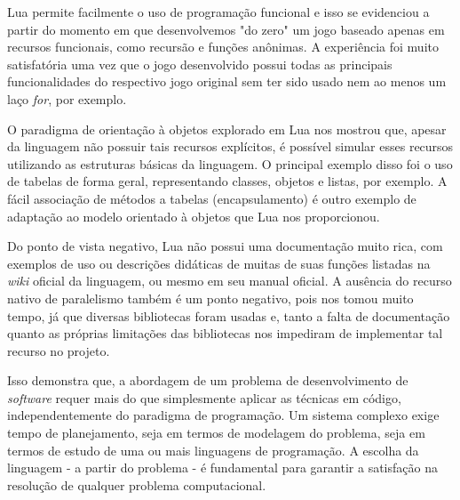 \documentclass[rel_mlp]{iiufrgs}
\begin{document}
Lua permite facilmente o uso de programação funcional e isso se evidenciou a partir do momento em que desenvolvemos "do zero" um jogo baseado apenas em recursos funcionais, como recursão e funções anônimas. A experiência foi muito satisfatória uma vez que o jogo desenvolvido possui todas as principais funcionalidades do respectivo jogo original sem ter sido usado nem ao menos um laço \textit{for}, por exemplo. 

O paradigma de orientação à objetos explorado em Lua nos mostrou que, apesar da linguagem não possuir tais recursos explícitos, é possível simular esses recursos utilizando as estruturas básicas da linguagem. O principal exemplo disso foi o uso de tabelas de forma geral, representando classes, objetos e listas, por exemplo. A fácil associação de métodos a tabelas (encapsulamento) é outro exemplo de adaptação ao modelo orientado à objetos que Lua nos proporcionou.

Do ponto de vista negativo, Lua não possui uma documentação muito rica, com exemplos de uso ou descrições didáticas de muitas de suas funções listadas na \textit{wiki} oficial da linguagem, ou mesmo em seu manual oficial. A ausência do recurso nativo de paralelismo também é um ponto negativo, pois nos tomou muito tempo, já que diversas bibliotecas foram usadas e, tanto a falta de documentação quanto as próprias limitações das bibliotecas nos impediram de implementar tal recurso no projeto.

Isso demonstra que, a abordagem de um problema de desenvolvimento de \textit{software} requer mais do que simplesmente aplicar as técnicas em código, independentemente do paradigma de programação. Um sistema complexo exige tempo de planejamento, seja em termos de modelagem do problema, seja em termos de estudo de uma ou mais linguagens de programação. A escolha da linguagem - a partir do problema - é fundamental para garantir a satisfação na resolução de qualquer problema computacional.






%

%



%

\end{document}
